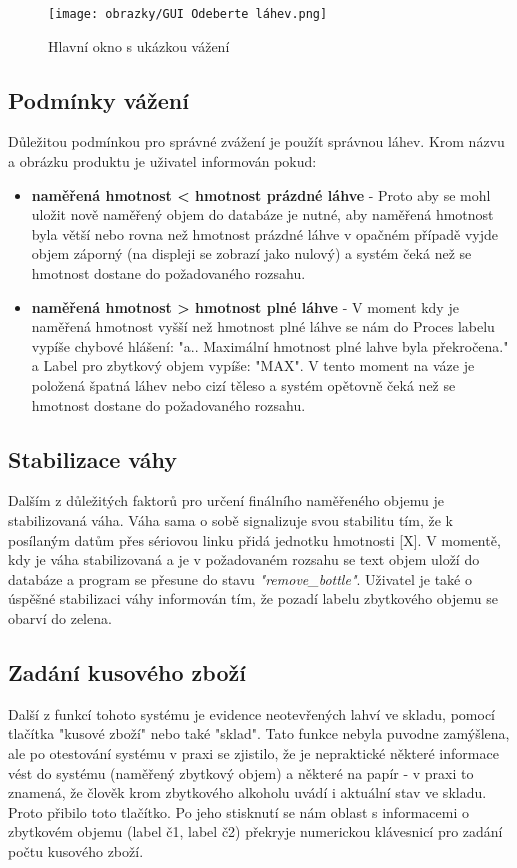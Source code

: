 \begin{figure}[H]
    \begin{center}
        \texttt{[image: obrazky/GUI Odeberte láhev.png]}
    \end{center}
    \caption{Hlavní okno s ukázkou vážení}
    \label{Hlavní okno s ukázkou vážení}
\end{figure}

\subsection{Podmínky vážení}
Důležitou podmínkou pro správné zvážení je použít správnou láhev. Krom názvu a obrázku produktu je uživatel informován pokud:
\begin{itemize}
    \item \textbf{naměřená hmotnost < hmotnost prázdné láhve} - Proto aby se mohl uložit nově naměřený objem do databáze je nutné, aby naměřená hmotnost byla větší nebo rovna než hmotnost prázdné láhve v opačném případě vyjde objem záporný (na displeji se zobrazí jako nulový) a systém čeká než se hmotnost dostane do požadovaného rozsahu.
    \item \textbf{naměřená hmotnost > hmotnost plné láhve} - V moment kdy je naměřená hmotnost vyšší než hmotnost plné láhve se nám do Proces labelu vypíše chybové hlášení: "a.. Maximální hmotnost plné lahve byla překročena." a Label pro zbytkový objem vypíše: "MAX". V tento moment na váze je položená špatná láhev nebo cizí těleso a systém opětovně čeká než se hmotnost dostane do požadovaného rozsahu.
\end{itemize}

\subsection{Stabilizace váhy}
Dalším z důležitých faktorů pro určení finálního naměřeného objemu je stabilizovaná váha. Váha sama o sobě signalizuje svou stabilitu tím, že k posílaným datům přes sériovou linku přidá jednotku hmotnosti [X]. V momentě, kdy je váha stabilizovaná a je v požadovaném rozsahu se text objem uloží do databáze a program se přesune do stavu \textit{"remove\_bottle"}. Uživatel je také o úspěšné stabilizaci váhy informován tím, že pozadí labelu zbytkového objemu se obarví do zelena. 

\subsection{Zadání kusového zboží}
Další z funkcí tohoto systému je evidence neotevřených lahví ve skladu, pomocí tlačítka "kusové zboží" nebo také "sklad". Tato funkce nebyla puvodne zamýšlena, ale po otestování systému v praxi se zjistilo, že je nepraktické některé informace vést do systému (naměřený zbytkový objem) a některé na papír - v praxi to znamená, že člověk krom zbytkového alkoholu uvádí i aktuální stav ve skladu. Proto přibilo toto tlačítko. Po jeho stisknutí se nám oblast s informacemi o zbytkovém objemu (label č1, label č2) překryje numerickou klávesnicí pro zadání počtu kusového zboží. %

